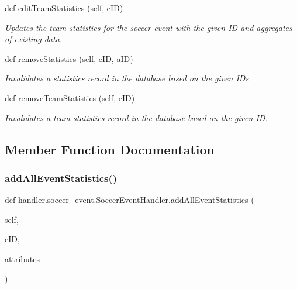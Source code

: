 \begin{DoxyCompactItemize}
def \hyperlink{classhandler_1_1soccer__event_1_1_soccer_event_handler_a72dada7cb3d2d6f6cbf0e6524a06b045}{edit\+Team\+Statistics} (self, e\+ID)
\begin{DoxyCompactList}\small\item\em Updates the team statistics for the soccer event with the given ID and aggregates of existing data. \end{DoxyCompactList}\item 
def \hyperlink{classhandler_1_1soccer__event_1_1_soccer_event_handler_ae99d308728553e202c1802c7cf9479ee}{remove\+Statistics} (self, e\+ID, a\+ID)
\begin{DoxyCompactList}\small\item\em Invalidates a statistics record in the database based on the given I\+Ds. \end{DoxyCompactList}\item 
def \hyperlink{classhandler_1_1soccer__event_1_1_soccer_event_handler_a435953be6920148b1f3eb47c6c656390}{remove\+Team\+Statistics} (self, e\+ID)
\begin{DoxyCompactList}\small\item\em Invalidates a team statistics record in the database based on the given ID. \end{DoxyCompactList}\end{DoxyCompactItemize}


\subsection{Member Function Documentation}
\mbox{\label{classhandler_1_1soccer__event_1_1_soccer_event_handler_a3ce48adca1bff4e7741e6fc4690b8220}} 
\subsubsection{\texorpdfstring{add\+All\+Event\+Statistics()}{addAllEventStatistics()}}
{\footnotesize\ttfamily def handler.\+soccer\+\_\+event.\+Soccer\+Event\+Handler.\+add\+All\+Event\+Statistics (\begin{DoxyParamCaption}\item[{}]{self,  }\item[{}]{e\+ID,  }\item[{}]{attributes }\end{DoxyParamCaption})}



